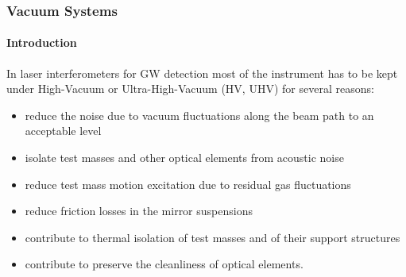 





%
\FloatBarrier
\subsubsection{Vacuum Systems}


\paragraph{Introduction}  \label{intro}

In laser interferometers for GW detection most of the instrument has to be kept under High-Vacuum or Ultra-High-Vacuum (HV, UHV) for several reasons:
\begin{itemize}
\item reduce the noise due to vacuum fluctuations along the beam path to an acceptable level
\item isolate test masses and other optical elements from acoustic noise
\item reduce test mass motion excitation due to residual gas fluctuations
\item reduce friction losses in the mirror suspensions
\item contribute to thermal isolation of test masses and of their support structures
\item contribute to preserve the cleanliness of optical elements.
\end{itemize}


